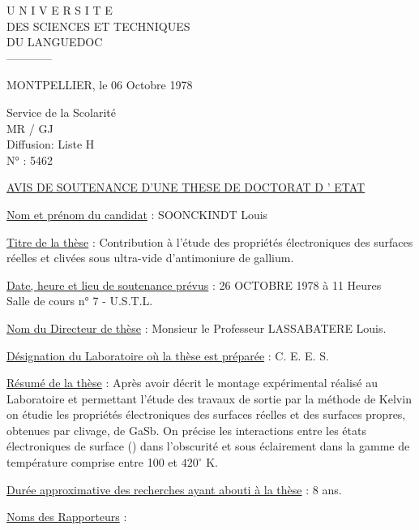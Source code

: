 
\begin{center}
U N I V E R S I T E\\
DES SCIENCES ET TECHNIQUES\\
DU LANGUEDOC\\
------------
\end{center}

MONTPELLIER, le 06 Octobre 1978

Service de la Scolarité\\
MR / GJ\\
Diffusion\quad : Liste H\\
N° : 5462

\begin{center}
\uline{AVIS DE SOUTENANCE D'UNE THESE DE DOCTORAT D ' ETAT}
\end{center}

\uline{Nom et prénom du candidat} : SOONCKINDT Louis

\uline{Titre de la thèse} : Contribution à l'étude des propriétés électroniques des surfaces réelles et clivées sous ultra-vide d'antimoniure de gallium.

\uline{Date, heure et lieu de soutenance prévus} : 26 OCTOBRE 1978 à 11 Heures\\
Salle de cours n° 7 - U.S.T.L.

\uline{Nom du Directeur de thèse} : Monsieur le Professeur LASSABATERE Louis.

\uline{Désignation du Laboratoire où la thèse est préparée} : C. E. E. S.

\uline{Résumé de la thèse} : Après avoir décrit le montage expérimental réalisé au Laboratoire et permettant l'étude des travaux de sortie par la méthode de Kelvin on étudie les propriétés électroniques des surfaces réelles et des surfaces propres, obtenues par clivage, de GaSb. On précise les interactions entre les états électroniques de surface () dans l'obscurité et sous éclairement dans la gamme de température comprise entre 100 et $420^\circ$ K.

\uline{Durée approximative des recherches ayant abouti à la thèse} : 8 ans.

\uline{Noms des Rapporteurs} :


